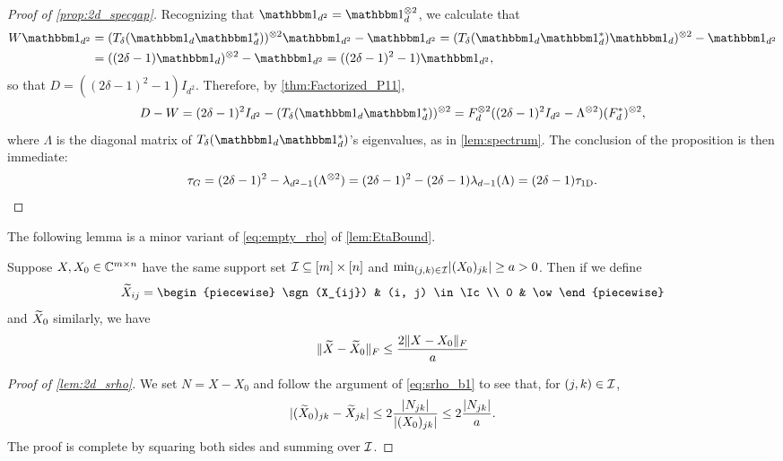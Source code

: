 \begin{proof}[Proof of \cref{prop:2d_specgap}]
  Recognizing that $\one_{d^2} = \one_d^{\kron 2}$, we calculate that
  \begin{align*}
    W \one_{d^2} &= (T_\delta(\one_d \one_d^*))^{\kron 2} \one_{d^2} - \one_{d^2} = (T_\delta(\one_d \one_d^*) \one_d)^{\kron 2} - \one_{d^2} \\
    &= ((2 \delta - 1) \one_d)^{\kron 2} - \one_{d^2} = ((2 \delta - 1)^2 - 1) \one_{d^2},
  \end{align*}
  so that $D = ((2 \delta - 1)^2 - 1) I_{d^2}$.  Therefore, by \cref{thm:Factorized_P11}, \[D - W = (2 \delta - 1)^2 I_{d^2} - (T_\delta(\one_d \one_d^*))^{\kron 2} = F_d^{\kron 2} ((2 \delta - 1)^2 I_{d^2} - \Lambda^{\kron 2}) (F_d^*)^{\kron 2},\] where $\Lambda$ is the diagonal matrix of $T_\delta(\one_d \one_d^*)$'s eigenvalues, as in \cref{lem:spectrum}.  The conclusion of the proposition is then immediate: \[\tau_G = (2 \delta - 1)^2 - \lambda_{d^2 - 1}(\Lambda^{\otimes 2}) = (2 \delta - 1)^2 - (2 \delta - 1) \lambda_{d - 1}(\Lambda) = (2 \delta - 1) \tau_{\rm 1D}.\]
\end{proof}
The following lemma is a minor variant of \eqref{eq:empty_rho} of \cref{lem:EtaBound}.
\begin{lemma} \label{lem:2d_srho}
  Suppose $X, X_0 \in \mathbb{C}^{m \times n}$ have the same support set $\mathcal{I} \subseteq [m] \times [n]$ and $\min_{(j, k) \in \mathcal{I}} \lvert(X_0)_{jk}\rvert \ge a > 0$.  Then if we define \[\tX_{ij} = \begin{piecewise} \sgn(X_{ij}) & (i, j) \in \Ic \\ 0 & \ow \end{piecewise}\] and $\widetilde{X}_0$ similarly, we have \[\lVert\widetilde{X} - \widetilde{X}_0\rVert_F \le \frac{2 \lVert X - X_0\rVert_F}{a}\]
\end{lemma}

\begin{proof}[Proof of \cref{lem:2d_srho}]
  We set $N = X - X_0$ and follow the argument of \eqref{eq:srho_b1} to see that, for $(j, k) \in \mathcal{I}$, \[\lvert(\widetilde{X}_0)_{jk} - \widetilde{X}_{jk}\rvert \le 2 \dfrac{\lvert N_{jk}\rvert}{\lvert(X_0)_{jk}\rvert} \le 2 \dfrac{\lvert N_{jk}\rvert}{a}.\]  The proof is complete by squaring both sides and summing over $\mathcal{I}$.
\end{proof}

